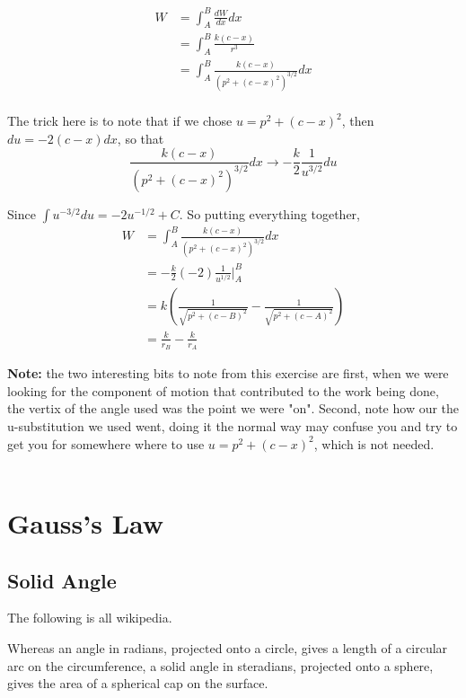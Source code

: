 \begin{align*}
W &= \int_{A}^{B} \frac{dW}{dx} dx \\
&= \int_{A}^{B} \frac{k (c-x)}{r^3} \\
&= \int_{A}^{B} \frac{k (c-x)}{\left(p^2 + (c-x)^2\right)^{3/2}} dx \\
\end{align*}

The trick here is to note that if we chose $u = p^2 + (c-x)^2$, then $du = -2(c-x) dx$, so that
$$
\frac{k (c-x)}{\left(p^2 + (c-x)^2\right)^{3/2}} dx \rightarrow -\frac{k}{2}\frac{1}{u^{3/2}} du
$$

Since $\int u^{-3/2} du = -2 u^{-1/2} + C$.
So putting everything together,
\begin{align*}
W &= \int_{A}^{B} \frac{k (c-x)}{\left(p^2 + (c-x)^2\right)^{3/2}} dx \\
&= -\frac{k}{2} (-2) \frac{1}{u^{1/2}} \Big|_{A}^{B} \\
&= k \left( \frac{1}{\sqrt{p^2 + (c-B)^2}} - \frac{1}{\sqrt{p^2 + (c-A)^2}} \right) \\
&= \frac{k}{r_B} - \frac{k}{r_A}
\end{align*}

\textbf{Note:} the two interesting bits to note from this exercise are first, when we were looking for the component
of motion that contributed to the work being done, the vertix of the angle used was the point we were "on".
Second, note how our the u-substitution we used went, doing it the normal way may confuse you
and try to get you for somewhere where to use $u = p^2 + (c-x)^2$, which is not needed.
\\~\\


\section{Gauss's Law}




\subsection{Solid Angle}

The following is all wikipedia.

Whereas an angle in radians, projected onto a circle, gives a length of a circular arc
on the circumference, a solid angle in steradians, projected onto a sphere,
gives the area of a spherical cap on the surface.

